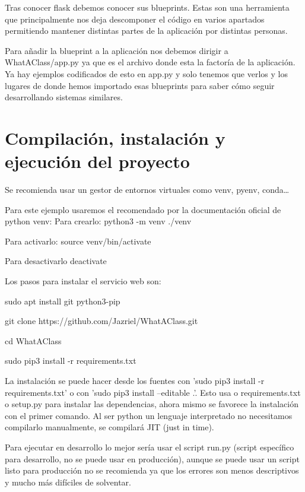 Tras conocer flask debemos conocer sus blueprints. Estas son una herramienta que principalmente nos deja descomponer el código en varios apartados permitiendo mantener distintas partes de la aplicación por distintas personas.

Para añadir la blueprint a la aplicación nos debemos dirigir a WhatAClass/app.py ya que es el archivo donde esta la factoría de la aplicación. Ya hay ejemplos codificados de esto en app.py y solo tenemos que verlos y los lugares de donde hemos importado esas blueprints para saber cómo seguir desarrollando sistemas similares.


 

\section{Compilación, instalación y ejecución del proyecto}

Se recomienda usar un gestor de entornos virtuales como venv, pyenv, conda\ldots

Para este ejemplo usaremos el recomendado por la documentación oficial de python venv: 
	Para crearlo:
python3 -m venv ./venv
	
	Para activarlo:
source venv/bin/activate

	Para desactivarlo
deactivate

Los pasos para instalar el servicio web son:
\begin{list}{-}{}
\item sudo apt install git python3-pip
\item git clone https://github.com/Jazriel/WhatAClass.git
\item cd WhatAClass
\item sudo pip3 install -r requirements.txt
\end{list}

La instalación se puede hacer desde los fuentes con 'sudo pip3 install -r requirements.txt' o con 'sudo pip3 install --editable .'. Esto usa o requirements.txt o setup.py para instalar las dependencias, ahora mismo se favorece la instalación con el primer comando. Al ser python un lenguaje interpretado no necesitamos compilarlo manualmente, se compilará JIT (just in time).

Para ejecutar en desarrollo lo mejor sería usar el script run.py (script específico para desarrollo, no se puede usar en producción), aunque se puede usar un script listo para producción no se recomienda ya que los errores son menos descriptivos y mucho más difíciles de solventar.

